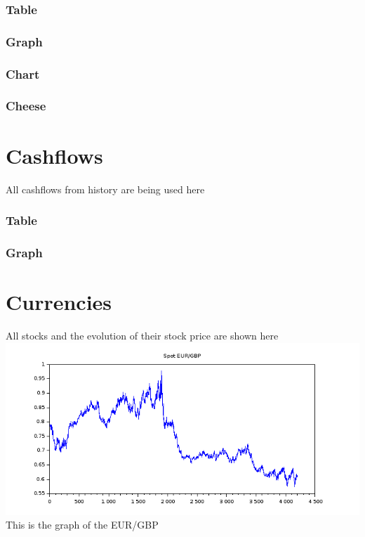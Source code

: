 \documentclass[8pt]{article} %
\begin{document}
\subsubsection{Table}

\subsubsection{Graph}

\subsubsection{Chart}
\subsubsection{Cheese}


\section{Cashflows}


All cashflows from history are being used here\\

\subsubsection{Table}

\subsubsection{Graph}
%

\section{Currencies}


All stocks and the evolution of their stock price are shown here\\
\includegraphics[scale=0.6]{Scilab-currencies.png}
This is the graph of the EUR/GBP 
\end{document}
